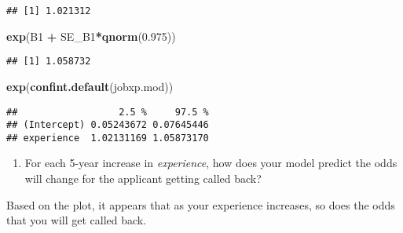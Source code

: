 \documentclass[
]{article}
\newenvironment{Shaded}{\begin{snugshade}}{\end{snugshade}}
\newcommand{\FloatTok}[1]{\textcolor[rgb]{0.00,0.00,0.81}{#1}}
\newcommand{\KeywordTok}[1]{\textcolor[rgb]{0.13,0.29,0.53}{\textbf{#1}}}
\newcommand{\NormalTok}[1]{#1}
\newcommand{\OperatorTok}[1]{\textcolor[rgb]{0.81,0.36,0.00}{\textbf{#1}}}
\newcommand{\StringTok}[1]{\textcolor[rgb]{0.31,0.60,0.02}{#1}}
\providecommand{\tightlist}{%
  \setlength{\itemsep}{0pt}\setlength{\parskip}{0pt}}
\begin{document}
\begin{verbatim}
## [1] 1.021312
\end{verbatim}

\begin{Shaded}
\begin{Highlighting}[]
\KeywordTok{exp}\NormalTok{(B1 }\OperatorTok{+}\StringTok{ }\NormalTok{SE_B1}\OperatorTok{*}\KeywordTok{qnorm}\NormalTok{(}\FloatTok{0.975}\NormalTok{))}
\end{Highlighting}
\end{Shaded}

\begin{verbatim}
## [1] 1.058732
\end{verbatim}

\begin{Shaded}
\begin{Highlighting}[]
\KeywordTok{exp}\NormalTok{(}\KeywordTok{confint.default}\NormalTok{(jobxp.mod))}
\end{Highlighting}
\end{Shaded}

\begin{verbatim}
##                  2.5 %     97.5 %
## (Intercept) 0.05243672 0.07645446
## experience  1.02131169 1.05873170
\end{verbatim}

\begin{enumerate}
\def\labelenumi{\arabic{enumi})}
\setcounter{enumi}{6}
\tightlist
\item
  For each 5-year increase in \emph{experience}, how does your model
  predict the odds will change for the applicant getting called back?
\end{enumerate}

Based on the plot, it appears that as your experience increases, so does
the odds that you will get called back.

\begin{Shaded}
\end{Shaded}
\end{document}
